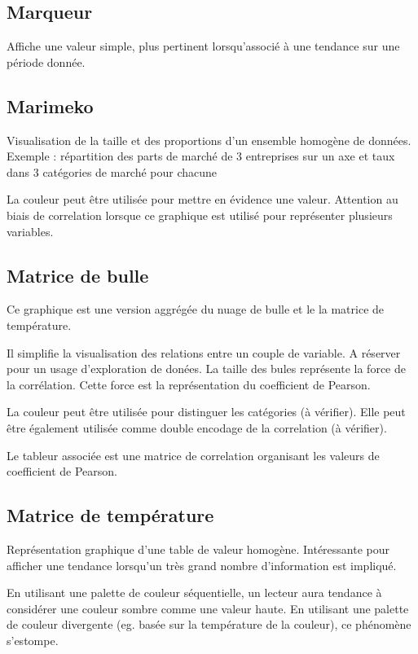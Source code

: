 \documentclass[a4paper,12pt]{article}
\begin{document}
\begin{multicols}{2}
\subsection*{Marqueur}
\label{sec:org4d61da1}
Affiche une valeur simple, plus pertinent lorsqu'associé à une tendance sur une période donnée. \autocite{mikeyiHowChooseRight2020}
\subsection*{Marimeko}
\label{sec:org434c5b9}
Visualisation de la taille et des proportions d'un ensemble homogène de données. \autocite{alansmithLexiqueVisuel}
Exemple : répartition des parts de marché de 3 entreprises sur un axe et taux dans 3 catégories de marché pour chacune

La couleur peut être utilisée pour mettre en évidence une valeur. \autocite{jonathanschwabishComparingCategories2021} Attention au biais de correlation lorsque ce graphique est utilisé pour représenter plusieurs variables. \autocite{jonathanschwabishComparingCategories2021}
\subsection*{Matrice de bulle}
\label{sec:org85fe28a}
Ce graphique est une version aggrégée du nuage de bulle et le la matrice de température.

Il simplifie la visualisation des relations entre un couple de variable. A réserver pour un usage d'exploration de donées. \autocite{sosulskiGraphics2019} La taille des bules représente la force de la corrélation. Cette force est la représentation du coefficient de Pearson. \autocite{jonathanschwabishRelationship2021}

La couleur peut être utilisée pour distinguer les catégories (à vérifier). Elle peut être également utilisée comme double encodage de la correlation (à vérifier).

Le tableur associée est une matrice de correlation organisant les valeurs de coefficient de Pearson.
\subsection*{Matrice de température}
\label{sec:org4e40f55}
Représentation graphique d'une table de valeur homogène. \autocite{sosulskiGraphics2019}
Intéressante pour afficher une tendance lorsqu'un très grand nombre d'information est impliqué.

En utilisant une palette de couleur séquentielle, un lecteur aura tendance à considérer une couleur sombre comme une valeur haute. En utilisant une palette de couleur divergente (eg. basée sur la température de la couleur), ce phénomène s'estompe.


\end{multicols}
\end{document}
